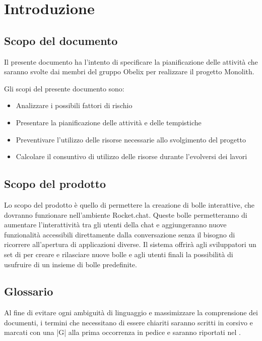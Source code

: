 \section{Introduzione}

\subsection{Scopo del documento}

Il presente documento ha l’intento di specificare la pianificazione delle attività che saranno svolte dai membri del gruppo Obelix per realizzare il progetto Monolith.

Gli scopi del presente documento sono:
\begin{itemize}
\item Analizzare i possibili fattori di rischio
\item Presentare la pianificazione delle attività e delle tempistiche
\item Preventivare l'utilizzo delle risorse necessarie allo svolgimento del progetto
\item Calcolare il consuntivo di utilizzo delle risorse durante l'evolversi dei lavori
\end{itemize}

\subsection{Scopo del prodotto}

Lo scopo del prodotto è quello di permettere la creazione di bolle
interattive, che dovranno funzionare nell’ambiente Rocket.chat. Queste
bolle permetteranno di aumentare l'interattività tra gli utenti della
chat e aggiungeranno nuove funzionalità accessibili
direttamente dalla conversazione senza il bisogno di ricorrere
all'apertura di applicazioni diverse.
Il sistema offrirà agli sviluppatori un set di  per creare e
rilasciare nuove bolle e agli utenti finali la possibilità di
usufruire di un insieme di bolle predefinite.

\subsection{Glossario}

Al fine di evitare ogni ambiguità di linguaggio e massimizzare la
comprensione dei documenti, i termini che necessitano di essere
chiariti saranno scritti in corsivo e marcati con una |G| alla prima
occorrenza in pedice e
saranno riportati nel \gloss.

